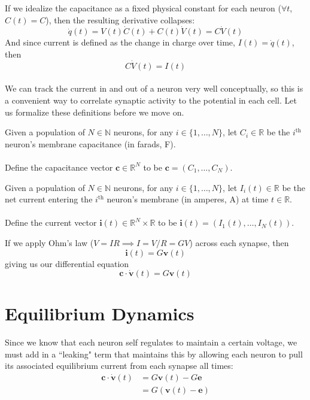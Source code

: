 \documentclass{article}
\begin{document}
If we idealize the capacitance as a fixed physical constant for each neuron ($\forall t$, $C(t)=C$), then the resulting derivative collapses:
\[ \dot{q}(t) = V(t)\dot{C}(t) + C(t)\dot{V}(t) = C\dot{V}(t) \]
And since current is defined as the change in charge over time, $I(t) = \dot{q}(t)$, then
\[ C\dot{V}(t) = I(t) \]

\paragraph{}
We can track the current in and out of a neuron very well conceptually, so this is a convenient way to correlate synaptic activity to the potential in each cell. Let us formalize these definitions before we move on.

\begin{definition}[$\mathbf{c} = \textbf{capacitence vector}$]\label{c}
Given a population of $N\in\mathbb{N}$ neurons, for any $i \in \{ 1, \dots, N \}$, let $C_{i}\in\mathbb{R}$ be the $i^{\text{th}}$ neuron's membrane capacitance (in farads, F).\\
\\
Define the capacitance vector $\mathbf{c}\in\mathbb{R}^{N}$ to be $\mathbf{c} = ( C_{1}, \dots, C_{N} )$. 
\end{definition}

\begin{definition}[$\mathbf{i}(t) = \textbf{current vector}$]\label{i}
Given a population of $N\in\mathbb{N}$ neurons, for any $i \in \{ 1, \dots, N \}$, let $I_{i}(t)\in\mathbb{R}$ be the net current entering the $i^{\text{th}}$ neuron's membrane (in amperes, A) at time $t\in\mathbb{R}$.\\
\\
Define the current vector $\mathbf{i}(t)\in\mathbb{R}^{N}\times\mathbb{R}$ to be $\mathbf{i}(t) = ( I_{1}(t), \dots, I_{N}(t) )$.
\end{definition}

If we apply Ohm's law ($V=IR\implies I=V/R=GV$) across each synapse, then
\[ \mathbf{i}(t) = G\mathbf{v}(t) \]
giving us our differential equation
\[ \mathbf{c}\cdot\dot{\mathbf{v}}(t) = G\mathbf{v}(t) \]

\section{Equilibrium Dynamics}
Since we know that each neuron self regulates to maintain a certain voltage, we must add in a ``leaking" term that maintains this by allowing each neuron to pull its associated equilibrium current from each synapse all times:
\begin{align*}
\mathbf{c}\cdot\dot{\mathbf{v}}(t) &= G\mathbf{v}(t) - G\mathbf{e}\\
	&= G \left( \mathbf{v}(t) - \mathbf{e} \right) 
\end{align*}
\end{document}

